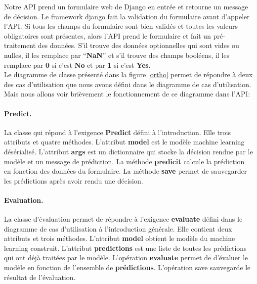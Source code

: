 \documentclass[12pt, french]{report}
\begin{document}
Notre API prend un formulaire web de Django en entrée et retourne un message de décision. Le framework django fait la validation du formulaire avant d'appeler l'API. Si tous les champs du formulaire sont bien validés et toutes les valeurs obligatoires sont présentes, alors l'API prend le formulaire et fait un pré-traitement des données. S'il trouve des données optionnelles qui sont vides ou nulles, il les remplace par ``\textbf{NaN}'' et s'il trouve des champs booléens, il les remplace par \textbf{0} si c'est \textbf{No} et par \textbf{1} si c'est \textbf{Yes}. \\

Le diagramme de classe présenté dans la figure \ref{ortho} permet de répondre à deux des cas d'utilisation que nous avons défini dans le diagramme de cas d'utilisation. Mais nous allons voir brièvement le fonctionnement de ce diagramme dans l'API:

\paragraph{Predict. } La classe qui répond à l'exigence \textbf{Predict} défini à l'introduction. Elle trois attributs et quatre méthodes. L'attribut \textbf{model} est le modèle machine learning désérialisé. L'attribut \textbf{args} est un dictionnaire qui stocke la décision rendue par le modèle et un message de prédiction. La méthode \textbf{predicit} calcule la prédiction en fonction des données du formulaire. La méthode \textbf{save} permet de sauvegarder les prédictions après avoir rendu une décision. 
\paragraph{Evaluation. } La classe d'évaluation permet de répondre à l'exigence \textbf{evaluate} défini dans le diagramme de cas d'utilisation à l'introduction générale. Elle contient deux attributs et trois méthodes. L'attribut \textbf{model} obtient le modèle du machine learning construit. L'attribut \textbf{predictions} est une liste de toutes les prédictions qui ont déjà traitées par le modèle. L'opération \textbf{evaluate} permet de d'évaluer le modèle en fonction de l'ensemble de \textbf{prédictions}. L'opération save sauvegarde le résultat de l'évaluation. \\
\end{document}
